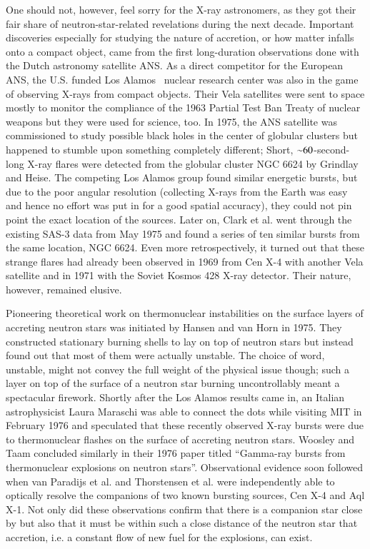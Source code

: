 One should not, however, feel sorry for the X-ray astronomers, as they got their fair share of neutron-star-related revelations during the next decade.
Important discoveries especially for studying the nature of accretion, or how matter infalls onto a compact object, came from the first long-duration observations done with the Dutch astronomy satellite ANS.
As a direct competitor for the European ANS, the U.S. funded Los Alamos  nuclear research center was also in the game of observing X-rays from compact objects.
Their Vela satellites were sent to space mostly to monitor the compliance of the 1963 Partial Test Ban Treaty of nuclear weapons but they were used for science, too.
In 1975, the ANS satellite was commissioned to study possible black holes in the center of globular clusters but happened to stumble upon something completely different;
Short, $\mathord{\sim} 60$-second-long X-ray flares were detected from the globular cluster NGC 6624 by Grindlay and Heise.\cite{GGS76}
The competing Los Alamos group found similar energetic bursts, but due to the poor angular resolution (collecting X-rays from the Earth was easy and hence no effort was put in for a good spatial accuracy), they could not pin point the exact location of the sources.\cite{BCE76}
Later on, Clark et al. went through the existing SAS-3 data from May 1975 and found a series of ten similar bursts from the same location, NGC 6624.\cite{CJB76}
Even more retrospectively, it turned out that these strange flares had already been observed in 1969 from Cen X-4\cite{BCE72} with another Vela satellite and in 1971 with the Soviet Kosmos 428 X-ray detector\cite{BKM75}.
Their nature, however, remained elusive.

Pioneering theoretical work on thermonuclear instabilities on the surface layers of accreting neutron stars was initiated by Hansen and van Horn in 1975.\cite{HvH75}
They constructed stationary burning shells to lay on top of neutron stars but instead found out that most of them were actually unstable.
The choice of word, unstable, might not convey the full weight of the physical issue though;
such a layer on top of the surface of a neutron star burning uncontrollably meant a spectacular firework.
Shortly after the Los Alamos results came in, an Italian astrophysicist Laura Maraschi was able to connect the dots while visiting MIT in February 1976 and speculated that these recently observed X-ray bursts were due to thermonuclear flashes on the surface of accreting neutron stars.\cite{MC77, Lewin93}
Woosley and Taam concluded similarly in their 1976 paper titled ``Gamma-ray bursts from thermonuclear explosions on neutron stars''.\cite{WT76}
Observational evidence soon followed when van Paradijs et al. and Thorstensen et al. were independently able to optically resolve the companions of two known bursting sources, Cen X-4\cite{vPV80} and Aql X-1\cite{TCB78}.
Not only did these observations confirm that there is a companion star close by but also that it must be within such a close distance of the neutron star that accretion, i.e. a constant flow of new fuel for the explosions, can exist.


